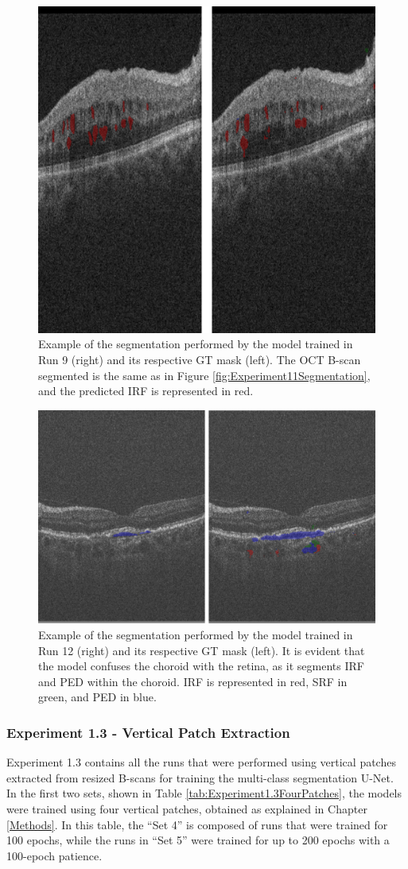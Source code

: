 \begin{figure}[!ht]
	\centering
	\includegraphics[width=0.5\linewidth]{figures/BigPatchSegmentationCirrus.png}
	\caption{Example of the segmentation performed by the model trained in Run 9 (right) and its respective GT mask (left). The OCT B-scan segmented is the same as in Figure \ref{fig:Experiment11Segmentation}, and the predicted IRF is represented in red.}
	\label{fig:BigPatchesSegmentationCirrus}
\end{figure}

\begin{figure}[!ht]
	\centering
	\includegraphics[width=0.6\linewidth]{figures/BigPatchSegmentationTopcon.png}
	\caption{Example of the segmentation performed by the model trained in Run 12 (right) and its respective GT mask (left). It is evident that the model confuses the choroid with the retina, as it segments IRF and PED within the choroid. IRF is represented in red, SRF in green, and PED in blue.}
	\label{fig:BigPatchesSegmentationTopcon}
\end{figure}

\subsubsection{Experiment 1.3 - Vertical Patch Extraction}
Experiment 1.3 contains all the runs that were performed using vertical patches extracted from resized B-scans for training the multi-class segmentation U-Net. In the first two sets, shown in Table \ref{tab:Experiment1.3FourPatches}, the models were trained using four vertical patches, obtained as explained in Chapter \ref{Methods}. In this table, the ``Set 4'' is composed of runs that were trained for 100 epochs, while the runs in ``Set 5'' were trained for up to 200 epochs with a 100-epoch patience.

